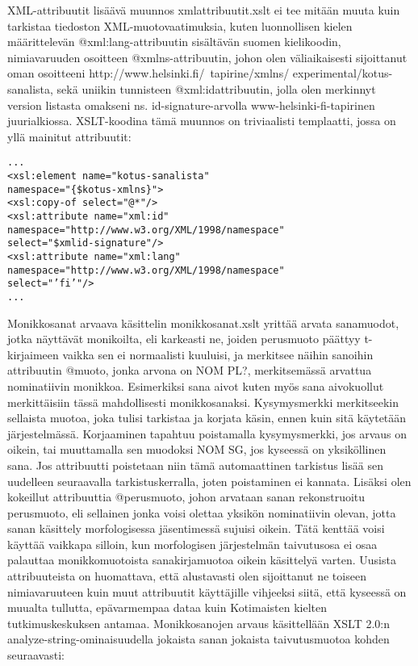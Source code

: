 \documentclass[free]{flammie}
\begin{document}
XML-attribuutit lisäävä muunnos xmlattribuutit.xslt ei tee mitään muuta kuin tarkistaa tiedoston XML-muotovaatimuksia, kuten luonnollisen kielen määrittelevän @xml:lang-attribuutin sisältävän suomen kielikoodin, nimiavaruuden osoitteen @xmlns-attribuutin, johon olen väliaikaisesti sijoittanut oman osoitteeni http://www.helsinki.fi/~tapirine/xmlns/
experimental/kotus-sanalista, sekä uniikin tunnisteen @xml:idattribuutin, jolla olen merkinnyt version listasta omakseni ns. id-signature-arvolla
www-helsinki-fi-tapirinen juurialkiossa. XSLT-koodina tämä muunnos on triviaalisti templaatti, jossa on yllä mainitut attribuutit:
\begin{verbatim}
...
<xsl:element name="kotus-sanalista"
namespace="{$kotus-xmlns}">
<xsl:copy-of select="@*"/>
<xsl:attribute name="xml:id"
namespace="http://www.w3.org/XML/1998/namespace"
select="$xmlid-signature"/>
<xsl:attribute name="xml:lang"
namespace="http://www.w3.org/XML/1998/namespace"
select="’fi’"/>
...
\end{verbatim}

Monikkosanat arvaava käsittelin monikkosanat.xslt yrittää arvata sanamuodot,
jotka näyttävät monikoilta, eli karkeasti ne, joiden perusmuoto päättyy
t-kirjaimeen vaikka sen ei normaalisti kuuluisi, ja merkitsee näihin sanoihin
attribuutin @muoto, jonka arvona on NOM PL?, merkitsemässä arvattua nominatiivin
monikkoa. Esimerkiksi sana aivot kuten myös sana aivokuollut merkittäisiin tässä
mahdollisesti monikkosanaksi. Kysymysmerkki merkitseekin sellaista muotoa, joka
tulisi tarkistaa ja korjata käsin, ennen kuin sitä käytetään järjestelmässä.
Korjaaminen tapahtuu poistamalla kysymysmerkki, jos arvaus on oikein, tai
muuttamalla sen muodoksi NOM SG, jos kyseessä on yksiköllinen sana. Jos
attribuutti poistetaan niin tämä automaattinen tarkistus lisää sen uudelleen
seuraavalla tarkistuskerralla, joten poistaminen ei kannata. Lisäksi olen
kokeillut attribuuttia @perusmuoto, johon arvataan sanan rekonstruoitu
perusmuoto, eli sellainen jonka voisi olettaa yksikön nominatiivin olevan, jotta
sanan käsittely morfologisessa jäsentimessä sujuisi oikein. Tätä kenttää voisi
käyttää vaikkapa silloin, kun morfologisen järjestelmän taivutusosa ei osaa
palauttaa monikkomuotoista sanakirjamuotoa oikein käsittelyä varten. Uusista
attribuuteista on huomattava, että alustavasti olen sijoittanut ne toiseen
nimiavaruuteen kuin muut attribuutit käyttäjille vihjeeksi siitä, että kyseessä
on muualta tullutta, epävarmempaa dataa kuin Kotimaisten kielten
tutkimuskeskuksen antamaa. Monikkosanojen arvaus käsittellään XSLT 2.0:n
analyze-string-ominaisuudella jokaista sanan jokaista taivutusmuotoa kohden
seuraavasti:
\end{document}
